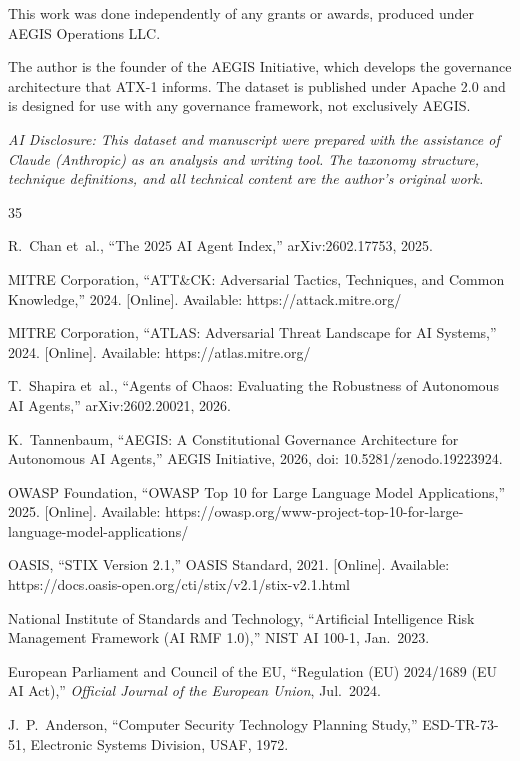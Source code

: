 \documentclass{IEEEoj-data}
\begin{document}
This work was done independently of any grants or awards, produced under AEGIS Operations LLC.

The author is the founder of the AEGIS Initiative, which develops the governance architecture that ATX-1 informs. The dataset is published under Apache 2.0 and is designed for use with any governance framework, not exclusively AEGIS.

{\it AI Disclosure: This dataset and manuscript were prepared with the assistance of Claude (Anthropic) as an analysis and writing tool. The taxonomy structure, technique definitions, and all technical content are the author's original work.}


\begin{thebibliography}{35}

R.~Chan et~al., ``The 2025 AI Agent Index,'' arXiv:2602.17753, 2025.

MITRE Corporation, ``ATT\&CK: Adversarial Tactics, Techniques, and Common Knowledge,'' 2024. [Online]. Available: https://attack.mitre.org/

MITRE Corporation, ``ATLAS: Adversarial Threat Landscape for AI Systems,'' 2024. [Online]. Available: https://atlas.mitre.org/

T.~Shapira et~al., ``Agents of Chaos: Evaluating the Robustness of Autonomous AI Agents,'' arXiv:2602.20021, 2026.

K.~Tannenbaum, ``AEGIS: A Constitutional Governance Architecture for Autonomous AI Agents,'' AEGIS Initiative, 2026, doi: 10.5281/zenodo.19223924.

OWASP Foundation, ``OWASP Top 10 for Large Language Model Applications,'' 2025. [Online]. Available: https://owasp.org/www-project-top-10-for-large-language-model-applications/

OASIS, ``STIX Version 2.1,'' OASIS Standard, 2021. [Online]. Available: https://docs.oasis-open.org/cti/stix/v2.1/stix-v2.1.html

National Institute of Standards and Technology, ``Artificial Intelligence Risk Management Framework (AI RMF 1.0),'' NIST AI 100-1, Jan.\ 2023.

European Parliament and Council of the EU, ``Regulation (EU) 2024/1689 (EU AI Act),'' {\it Official Journal of the European Union}, Jul.\ 2024.

J.~P.~Anderson, ``Computer Security Technology Planning Study,'' ESD-TR-73-51, Electronic Systems Division, USAF, 1972.


\end{thebibliography}
\end{document}
